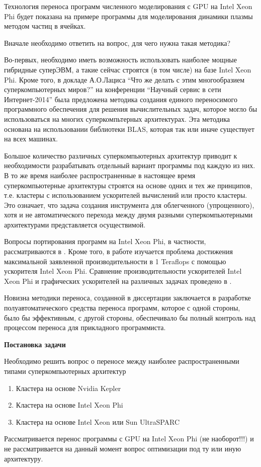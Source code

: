 Технология переноса программ численного моделирования с GPU на Intel Xeon Phi
будет показана на примере программы для моделирования динамики плазмы методом частиц в ячейках.

Вначале необходимо ответить на вопрос, для чего нужна такая методика?

Во-первых, необходимо иметь возможность использовать наиболее мощные гибридные суперЭВМ, а такие сейчас строятся (в том числе) на базе Intel Xeon Phi. Кроме того, в
докладе А.О.Лациса “Что же делать с этим многообразием суперкомпьютерных миров?” на конференции “Научный сервис в сети Интернет-2014” \cite{Lacis2014} была предложена методика создания единого переносимого программного обеспечения для решения вычислительных задач, которое могло бы использоваться на многих суперкомпьтерных архитектурах. Эта методика основана на использовании библиотеки BLAS, которая так или иначе существует на всех машинах.

Большое количество различных суперкомпьютерных архитектур приводит к необходимости разрабатывать отдельный вариант программы под каждую из них.
В то же время наиболее распространенные в настоящее время суперкомпьютерные архитектуры строятся на основе одних и тех же принципов, т.е. кластеры с использованием ускорителей вычислений или просто кластеры.
Это означает, что задача создания инструмента для облегченного (упрощенного), хотя и не автоматического перехода между двумя разными  суперкомпьютерными архитектурами
представляется осуществимой.

Вопросы портирования программ на Intel Xeon Phi, в частности, рассматриваются в \cite{Rosales2Phi}. Кроме того, в работе \cite{Nakashima2015} изучается проблема достижения максимальной заявленной производительности в 1 Teraflops с помощью ускорителя Intel Xeon Phi. Сравнение производительности ускорителей Intel Xeon Phi и графических ускорителей на различных задачах проведено в \cite{Lyakh201584,Liu2015230,Bernaschi20142495}.

Новизна методики переноса, созданной в диссертации заключается в разработке полуавтоматического средства переноса программ,
которое с одной стороны, было бы эффективным,
с другой стороны, обеспечивало бы полный контроль над процессом переноса для прикладного программиста.

\textbf{Постановка задачи}

Необходимо решить вопрос о переносе между наиболее распространенными типами суперкомпьютерных архитектур
\begin{enumerate}
	\item Кластера на основе Nvidia Kepler 
	\item Кластера на основе Intel Xeon Phi
	\item Кластера на основе Intel Xeon или Sun UltraSPARC
\end{enumerate}
Рассматривается перенос программы с GPU на Intel Xeon Phi (не наоборот!!!) и не рассматривается на данный момент вопрос оптимизации под ту или иную архитектуру.

